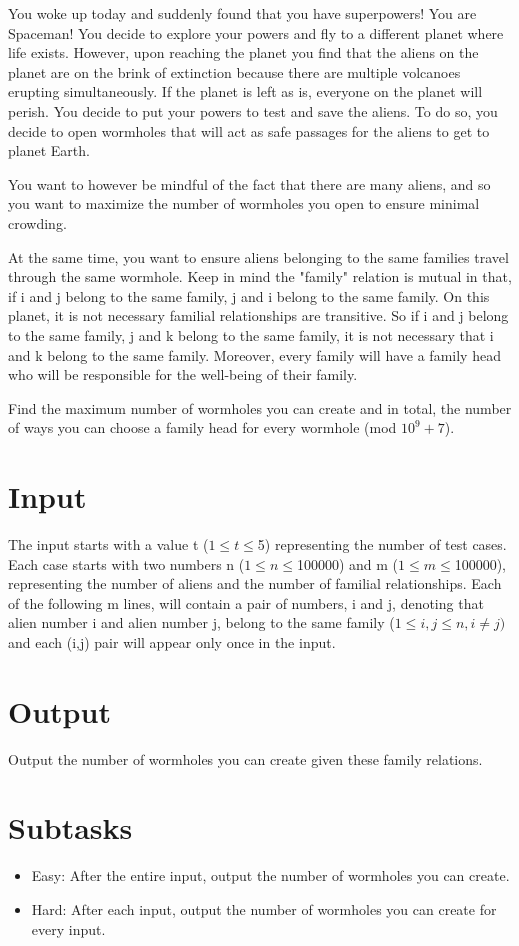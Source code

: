 
You woke up today and suddenly found that you have superpowers! You are Spaceman! You decide to explore your powers and fly to a different planet where life exists. However, upon reaching the planet you find that the aliens on the planet are on the brink of extinction because there are multiple volcanoes erupting simultaneously. If the planet is left as is, everyone on the planet will perish. You decide to put your powers to test and save the aliens. To do so, you decide to open wormholes that will act as safe passages for the aliens to get to planet Earth.

You want to however be mindful of the fact that there are many aliens, and so you want to maximize the number of wormholes you open to ensure minimal crowding. 

At the same time, you want to ensure aliens belonging to the same families travel through the same wormhole. Keep in mind the "family" relation is mutual in that, if i and j belong to the same family, j and i belong to the same family. On this planet, it is not necessary familial relationships are transitive. So if i and j belong to the same family, j and k belong to the same family, it is not necessary that i and k belong to the same family. Moreover, every family will have a family head who will be responsible for the well-being of their family. 

Find the maximum number of wormholes you can create and in total, the number of ways you can choose a family head for every wormhole (mod $10^{9}+7$).\newline

\section*{Input}
 \indent The input starts with a value t ($1 \le t \le $5) representing the number of test cases. 
  Each case starts with two numbers n ($1 \le n \le $100000) and m ($1 \le m \le $100000), representing the number of aliens and the number of familial relationships. Each of the following m lines, will contain a pair of numbers, i and j, denoting that alien number i and alien number j, belong to the same family ($1 \le i,j \le n, i \neq j)$ and each (i,j) pair will appear only once in the input.

\section*{Output}
Output the number of wormholes you can create given these family relations.

\section*{Subtasks}
\begin{itemize}
	 \item Easy: After the entire input, output the number of wormholes you can create.
    	 \item Hard: After each input, output the number of wormholes you can create for every input.
\end{itemize}